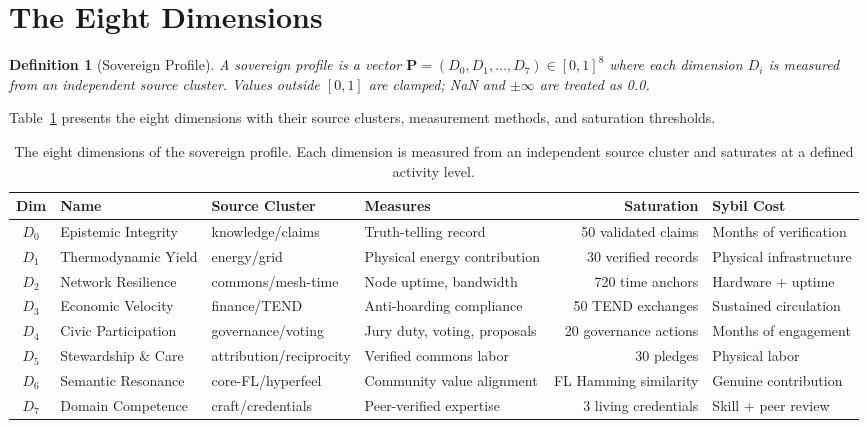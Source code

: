\documentclass[11pt,twocolumn]{article}
\newtheorem{definition}{Definition}
\begin{document}
\section{The Eight Dimensions}
\label{sec:dimensions}

\begin{definition}[Sovereign Profile]
A sovereign profile is a vector $\mathbf{P} = (D_0, D_1, \ldots, D_7) \in [0,1]^8$ where each dimension $D_i$ is measured from an independent source cluster. Values outside $[0,1]$ are clamped; NaN and $\pm\infty$ are treated as 0.0.
\end{definition}

Table~\ref{tab:dimensions} presents the eight dimensions with their source clusters, measurement methods, and saturation thresholds.

\begin{table}[t]
\centering
\caption{The eight dimensions of the sovereign profile. Each dimension is measured from an independent source cluster and saturates at a defined activity level.}
\label{tab:dimensions}
\begin{tabular}{clllrl}
\toprule
\textbf{Dim} & \textbf{Name} & \textbf{Source Cluster} & \textbf{Measures} & \textbf{Saturation} & \textbf{Sybil Cost} \\
\midrule
$D_0$ & Epistemic Integrity & knowledge/claims & Truth-telling record & 50 validated claims & Months of verification \\
$D_1$ & Thermodynamic Yield & energy/grid & Physical energy contribution & 30 verified records & Physical infrastructure \\
$D_2$ & Network Resilience & commons/mesh-time & Node uptime, bandwidth & 720 time anchors & Hardware + uptime \\
$D_3$ & Economic Velocity & finance/TEND & Anti-hoarding compliance & 50 TEND exchanges & Sustained circulation \\
$D_4$ & Civic Participation & governance/voting & Jury duty, voting, proposals & 20 governance actions & Months of engagement \\
$D_5$ & Stewardship \& Care & attribution/reciprocity & Verified commons labor & 30 pledges & Physical labor \\
$D_6$ & Semantic Resonance & core-FL/hyperfeel & Community value alignment & FL Hamming similarity & Genuine contribution \\
$D_7$ & Domain Competence & craft/credentials & Peer-verified expertise & 3 living credentials & Skill + peer review \\
\bottomrule
\end{tabular}
\end{table}
\end{document}
